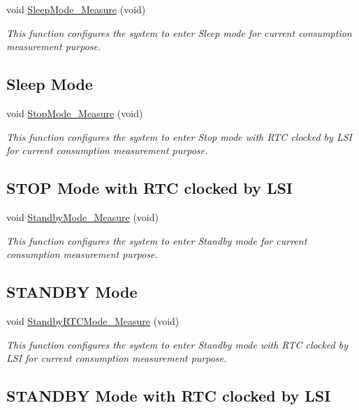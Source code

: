 \begin{DoxyCompactItemize}
void \hyperlink{group___p_w_r___current_consumption_ga2f529cc3e1d0252ce447c9cea539ca86}{Sleep\-Mode\-\_\-\-Measure} (void)
\begin{DoxyCompactList}\small\item\em This function configures the system to enter Sleep mode for current consumption measurement purpose. \subsection*{Sleep Mode }\end{DoxyCompactList}\item 
void \hyperlink{group___p_w_r___current_consumption_gaf617a1f1e224179c8081c4055938e184}{Stop\-Mode\-\_\-\-Measure} (void)
\begin{DoxyCompactList}\small\item\em This function configures the system to enter Stop mode with R\-T\-C clocked by L\-S\-I for current consumption measurement purpose. \subsection*{S\-T\-O\-P Mode with R\-T\-C clocked by L\-S\-I }\end{DoxyCompactList}\item 
void \hyperlink{group___p_w_r___current_consumption_ga160e808cb732d4a7a251ba2ce0277f58}{Standby\-Mode\-\_\-\-Measure} (void)
\begin{DoxyCompactList}\small\item\em This function configures the system to enter Standby mode for current consumption measurement purpose. \subsection*{S\-T\-A\-N\-D\-B\-Y Mode }\end{DoxyCompactList}\item 
void \hyperlink{group___p_w_r___current_consumption_ga8f7b3afba9358f5104885be0e0cfb672}{Standby\-R\-T\-C\-Mode\-\_\-\-Measure} (void)
\begin{DoxyCompactList}\small\item\em This function configures the system to enter Standby mode with R\-T\-C clocked by L\-S\-I for current consumption measurement purpose. \subsection*{S\-T\-A\-N\-D\-B\-Y Mode with R\-T\-C clocked by L\-S\-I }\end{DoxyCompactList}\item 

\end{DoxyCompactItemize}
